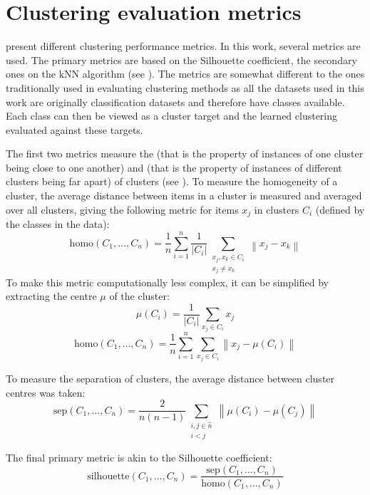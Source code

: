 \section{Clustering evaluation metrics}\label{sec:clustering-metrics}

\cite{xu_comprehensive_2015} present different clustering performance metrics. In this work, several metrics are used. The primary metrics are based on the Silhouette coefficient, the secondary ones on the kNN algorithm (see \cite{dasarathy_nearest_1991}). The metrics are somewhat different to the ones traditionally used in evaluating clustering methods as all the datasets used in this work are originally classification datasets and therefore have classes available. Each class can then be viewed as a cluster target and the learned clustering evaluated against these targets.

The first two metrics measure the  (that is the property of instances of one cluster being close to one another) and  (that is the property of instances of different clusters being far apart) of clusters (see \cite{everitt_cluster_2001}). To measure the homogeneity of a cluster, the average distance between items in a cluster is measured and averaged over all clusters, giving the following metric for items \( x_j \) in clusters \( C_i \) (defined by the classes in the data):
\[ \mathrm{homo} \left( C_1, \dots, C_n \right) = \frac{1}{n} \sum_{i = 1}^n \frac{1}{\left\lvert C_i \right\rvert} \sum_{\substack{x_j, x_k \in C_i \\ x_j \neq x_k}} \left\lVert x_j - x_k \right\rVert \]
To make this metric computationally less complex, it can be simplified by extracting the centre \( \mu \) of the cluster:
\[ \mu \left( C_i \right) = \frac{1}{\left\lvert C_i \right\rvert} \sum_{x_j \in C_i} x_j \]
\[ \mathrm{homo} \left( C_1, \dots, C_n \right) = \frac{1}{n} \sum_{i = 1}^n \sum_{x_j \in C_i} \left\lVert x_j - \mu \left( C_i \right) \right\rVert \]

To measure the separation of clusters, the average distance between cluster centres was taken:
\[ \mathrm{sep} \left( C_1, \dots, C_n \right) = \frac{2}{n \left( n - 1 \right)} \sum_{\substack{i, j \in \hat{n} \\ i < j }} \left\lVert \mu \left( C_i \right) - \mu \left( C_j \right) \right\rVert \]

The final primary metric is akin to the Silhouette coefficient:
\[ \mathrm{silhouette} \left( C_1, \dots, C_n \right) = \frac{\mathrm{sep} \left( C_1, \dots, C_n \right)}{\mathrm{homo} \left( C_1, \dots, C_n \right)} \]

